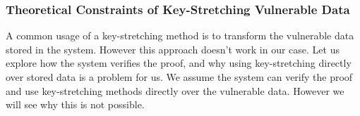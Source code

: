 %
%

\subsubsection{Theoretical Constraints of Key-Stretching Vulnerable Data}
A common usage of a key-stretching method is to transform the vulnerable data stored in the system.
However this approach doesn't work in our case.
Let us explore how the system verifies the proof, and why using key-stretching directly over stored data is a problem for us.
We assume the system can verify the proof and use key-stretching methods directly over the vulnerable data. 
However we will see why this is not possible.

\newpage
